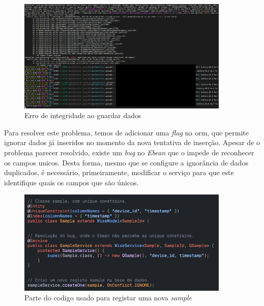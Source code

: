 \begin{figure}[!h]
	\centering
	\includegraphics[width=0.9\textwidth]{figs/error.png}
	\caption{Erro de integridade ao guardar dados}
	\label{fig:integretyErro}
\end{figure}

\clearpage
Para resolver este problema, temos de adicionar uma \textit{flag} na \acs{orm}, que permite ignorar dados já inseridos no momento da nova tentativa de inserção. Apesar de o problema parecer resolvido, existe um \textit{bug} no \textit{Ebean} que o impede de reconhecer os campos unicos. Desta forma, mesmo que se configure a ignorância de dados duplicados, é necessário, primeiramente, modificar o serviço para que este identifique quais os campos que são únicos.

\begin{figure}[!h]
	\centering
	\includegraphics[width=0.9\textwidth]{figs/codigoParaGuardarSamples.png}
	\caption{Parte do codigo usado para registar uma nova \textit{sample}}
	\label{fig:codeForNewSample}
\end{figure}


